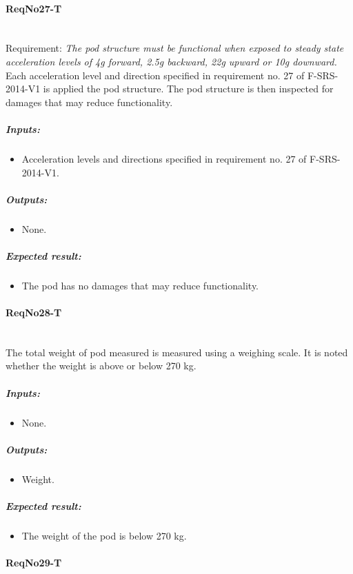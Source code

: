\paragraph{ReqNo27-T}\mbox{}\\ %
Requirement: \textit{The pod structure must be functional when exposed to steady state acceleration levels of 4g forward, 2.5g backward, 22g upward or 10g downward.}
\\
Each acceleration level and direction specified in requirement no. 27 of F-SRS-2014-V1 is applied the pod structure. The pod structure is then inspected for damages that may reduce functionality.

	\subparagraph{Inputs:}
	\begin{itemize}
	\item Acceleration levels and directions specified in requirement no. 27 of F-SRS-2014-V1.
	\end{itemize}
	\subparagraph{Outputs:}
	\begin{itemize}
	\item None.
	\end{itemize}
	\subparagraph{Expected result:}
	\begin{itemize}
	\item The pod has no damages that may reduce functionality.
	\end{itemize}


\paragraph{ReqNo28-T}\mbox{}\\ %
The total weight of pod measured is measured using a weighing scale. It is noted whether the weight is above or below 270 kg.
\\
	\subparagraph{Inputs:}
	\begin{itemize}
	\item None.
	\end{itemize}
	\subparagraph{Outputs:}
	\begin{itemize}
	\item Weight.
	\end{itemize}
	\subparagraph{Expected result:}
	\begin{itemize}
	\item The weight of the pod is below 270 kg.
	\end{itemize}

\paragraph{ReqNo29-T}\mbox{}\\ %


